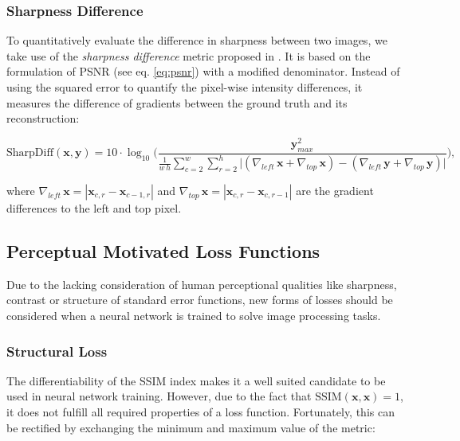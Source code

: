 \subsubsection*{Sharpness Difference}

To quantitatively evaluate the difference in sharpness between two images, we take use of the \textit{sharpness difference} metric proposed in \parencite{deep_multiscale_video_pred}. It is based on the formulation of PSNR (see eq. \ref{eq:psnr}) with a modified denominator. Instead of using the squared error to quantify the pixel-wise intensity differences, it measures the difference of gradients between the ground truth and its reconstruction:

\begin{equation} \label{eq:sharpdiff}
\textrm{SharpDiff}(\textbf{x}, \textbf{y}) = 10 \cdot \log_{10} \Bigg( \frac{\textbf{y}_{max}^2}{\frac{1}{w \, h} \sum_{c=2}^{w} \sum_{r=2}^{h} \big|(\nabla_{left} \, \textbf{x} + \nabla_{top} \, \textbf{x})-(\nabla_{left} \, \textbf{y} + \nabla_{top} \, \textbf{y})\big|} \Bigg) ,
\end{equation}

where $ \nabla_{left} \, \textbf{x} = |\textbf{x}_{c,r} - \textbf{x}_{c-1, r}| $ and $ \nabla_{top} \, \textbf{x} = |\textbf{x}_{c,r} - \textbf{x}_{c, r-1}| $ are the gradient differences to the left and top pixel.

\subsection{Perceptual Motivated Loss Functions} \label{sec:perc-loss}

Due to the lacking consideration of human perceptional qualities like sharpness, contrast or structure of standard error functions, new forms of losses should be considered when a neural network is trained to solve image processing tasks.

\subsubsection*{Structural Loss}

The differentiability of the SSIM index makes it a well suited candidate to be used in neural network training. However, due to the fact that $ \textrm{SSIM}(\textbf{x}, \textbf{x}) = 1 $, it does not fulfill all required properties of a loss function. Fortunately, this can be rectified by exchanging the minimum and maximum value of the metric:

